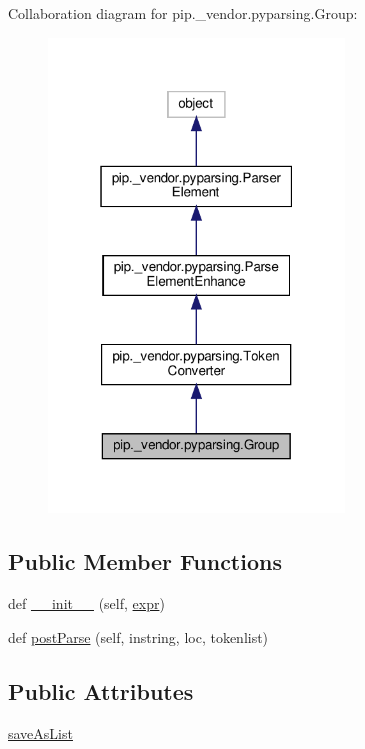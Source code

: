 Collaboration diagram for pip.\+\_\+vendor.\+pyparsing.\+Group\+:
\nopagebreak
\begin{figure}[H]
\begin{center}
\leavevmode
\includegraphics[width=223pt]{classpip_1_1__vendor_1_1pyparsing_1_1Group__coll__graph}
\end{center}
\end{figure}
\subsection*{Public Member Functions}
\begin{DoxyCompactItemize}
\item 
def \hyperlink{classpip_1_1__vendor_1_1pyparsing_1_1Group_a6ab829193f1a684c93990a695afe2d58}{\+\_\+\+\_\+init\+\_\+\+\_\+} (self, \hyperlink{classpip_1_1__vendor_1_1pyparsing_1_1ParseElementEnhance_af574b49a0a7d914693fdaa833df7098f}{expr})
\item 
def \hyperlink{classpip_1_1__vendor_1_1pyparsing_1_1Group_a4b25029a879c4c3cbabea61af7676a98}{post\+Parse} (self, instring, loc, tokenlist)
\end{DoxyCompactItemize}
\subsection*{Public Attributes}
\begin{DoxyCompactItemize}
\item 
\hyperlink{classpip_1_1__vendor_1_1pyparsing_1_1Group_ae6bf892b1fc18d728968e384cd903ee2}{save\+As\+List}
\end{DoxyCompactItemize}
